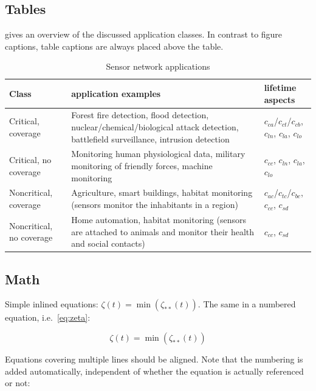 \subsection{Tables}

 gives an overview of the discussed application classes.
In contrast to figure captions, table captions are always placed above the table.

\begin{table}
	\centering
	\caption{Sensor network applications}
	\label{tab:SensorNetworkApplications}
	\begin{tabular}{>{\raggedright}p{1.8cm}p{5.4cm}p{3.4cm}}
		\toprule
		Class & application examples & lifetime aspects \\
		\midrule
		Critical, coverage & 
				Forest fire detection, flood detection, nuclear/chemical/biological attack detection, battlefield surveillance, intrusion detection & 
				$c_{ca}$/$c_{ct}$/$c_{cb}$, $c_{ln}$, $c_{la}$, $c_{lo}$\\
		Critical, no coverage & 
				Monitoring human physiological data, military monitoring of friendly forces, machine monitoring & 
				$c_{cc}$, $c_{ln}$, $c_{la}$, $c_{lo}$ \\
		Noncritical, coverage & 
				Agriculture, smart buildings, habitat monitoring (sensors monitor the inhabitants in a region) & 
				$c_{ac}$/$c_{tc}$/$c_{bc}$, $c_{cc}$, $c_{sd}$ \\
		Noncritical, no coverage & 
				Home automation, habitat monitoring (sensors are attached to animals and monitor their health and social contacts) & 
				$c_{cc}$, $c_{sd}$ 	\\
		\bottomrule
	\end{tabular}
\end{table}


\subsection{Math}

Simple inlined equations: $\zeta(t) = \min( \zeta_{**}(t))$.
The same in a numbered equation, i.e.\ \cref{eq:zeta}:

\begin{equation}
\zeta(t) = \min( \zeta_{**}(t))
\label{eq:zeta}
\end{equation}

Equations covering multiple lines should be aligned. Note that the numbering is added automatically, independent of whether the equation is actually referenced or not:

